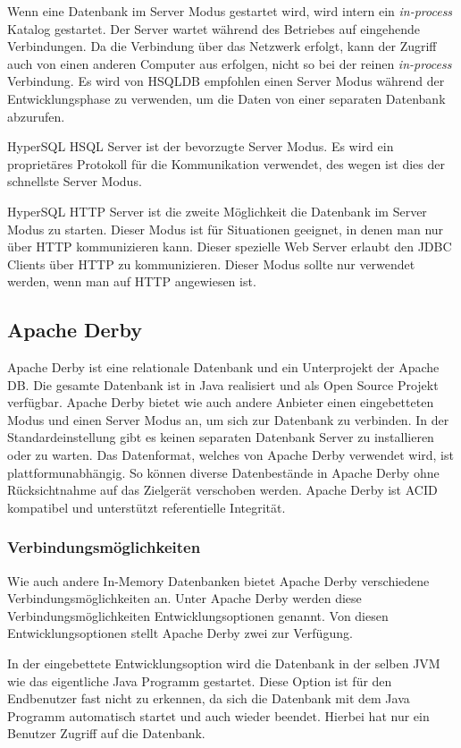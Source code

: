 \documentclass[draft,final]{vutinfth} %
\begin{document}
Wenn eine Datenbank im Server Modus gestartet wird, wird intern ein \textit{in-process} Katalog gestartet. Der Server wartet während des Betriebes auf eingehende Verbindungen. Da die Verbindung über das Netzwerk erfolgt, kann der Zugriff auch von einen anderen Computer aus erfolgen, nicht so bei der reinen \textit{in-process} Verbindung. Es wird von HSQLDB empfohlen einen Server Modus während der Entwicklungsphase zu verwenden, um die Daten von einer separaten Datenbank abzurufen.

HyperSQL HSQL Server ist der bevorzugte Server Modus. Es wird ein proprietäres Protokoll für die Kommunikation verwendet, des wegen ist dies der schnellste Server Modus.

HyperSQL HTTP Server ist die zweite Möglichkeit die Datenbank im Server Modus zu starten. Dieser Modus ist für Situationen geeignet, in denen man nur über HTTP kommunizieren kann. Dieser spezielle Web Server erlaubt den JDBC Clients über HTTP zu kommunizieren. Dieser Modus sollte nur verwendet werden, wenn man auf HTTP angewiesen ist.

\cite{HSQLGuide}

\subsection{Apache Derby}
Apache Derby ist eine relationale Datenbank und ein Unterprojekt der Apache DB. Die gesamte Datenbank ist in Java realisiert und als Open Source Projekt verfügbar. Apache Derby bietet wie auch andere Anbieter einen eingebetteten Modus und einen Server Modus an, um sich zur Datenbank zu verbinden. In der Standardeinstellung gibt es keinen separaten Datenbank Server zu installieren oder zu warten. Das Datenformat, welches von Apache Derby verwendet wird, ist plattformunabhängig. So können diverse Datenbestände in Apache Derby ohne Rücksichtnahme auf das Zielgerät verschoben werden. Apache Derby ist ACID kompatibel und unterstützt referentielle Integrität.

\subsubsection*{Verbindungsmöglichkeiten}
Wie auch andere In-Memory Datenbanken bietet Apache Derby verschiedene Verbindungsmöglichkeiten an. Unter Apache Derby werden diese Verbindungsmöglichkeiten Entwicklungsoptionen genannt. Von diesen Entwicklungsoptionen stellt Apache Derby zwei zur Verfügung. 

In der eingebettete Entwicklungsoption wird die Datenbank in der selben JVM wie das eigentliche Java Programm gestartet. Diese Option ist für den Endbenutzer fast nicht zu erkennen, da sich die Datenbank mit dem Java Programm automatisch startet und auch wieder beendet. Hierbei hat nur ein Benutzer Zugriff auf die Datenbank.
\end{document}
